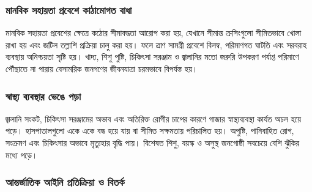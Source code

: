 \subsubsection{মানবিক সহায়তা প্রবেশে কাঠামোগত
বাধা}\label{ux9aeux9a8ux9acux995-ux9b8ux9b9ux9afux9a4-ux9aaux9b0ux9acux9b6-ux995ux9a0ux9aeux997ux9a4-ux9acux9a7}

মানবিক সহায়তা প্রবেশের ক্ষেত্রে কঠোর সীমাবদ্ধতা আরোপ করা হয়, যেখানে সীমান্ত
ক্রসিংগুলো সীমিতভাবে খোলা রাখা হয় এবং জটিল তল্লাশি প্রক্রিয়া চালু করা হয়। ফলে
ত্রাণ সামগ্রী প্রবেশে বিলম্ব, পরিমাণগত ঘাটতি এবং সরবরাহ ব্যবস্থায় অনিশ্চয়তা
সৃষ্টি হয়। খাদ্য, শিশু পুষ্টি, চিকিৎসা সরঞ্জাম ও জ্বালানির মতো জরুরি উপকরণ পর্যাপ্ত
পরিমাণে পৌঁছাতে না পারায় বেসামরিক জনগণের জীবনযাত্রা চরমভাবে বিপর্যস্ত হয়।
\vspace{0.3em}

\subsubsection{স্বাস্থ্য ব্যবস্থার ভেঙে
পড়া}\label{ux9b8ux9acux9b8ux9a5ux9af-ux9acux9afux9acux9b8ux9a5ux9b0-ux9adux999-ux9aaux9a1}

জ্বালানি সংকট, চিকিৎসা সরঞ্জামের অভাব এবং অতিরিক্ত রোগীর চাপের কারণে গাজার
স্বাস্থ্যব্যবস্থা কার্যত অচল হয়ে পড়ে। হাসপাতালগুলো একে একে বন্ধ হয়ে যায় বা সীমিত
সক্ষমতায় পরিচালিত হয়। অপুষ্টি, পানিবাহিত রোগ, সংক্রমণ এবং চিকিৎসার অভাবে
মৃত্যুহার বৃদ্ধি পায়। বিশেষত শিশু, বয়স্ক ও অসুস্থ জনগোষ্ঠী সবচেয়ে বেশি ঝুঁকির মধ্যে
পড়ে।
\vspace{0.3em}

\subsubsection{আন্তর্জাতিক আইনি প্রতিক্রিয়া ও
বিতর্ক}\label{ux986ux9a8ux9a4ux9b0ux99cux9a4ux995-ux986ux987ux9a8-ux9aaux9b0ux9a4ux995ux9b0ux9af-ux993-ux9acux9a4ux9b0ux995}

